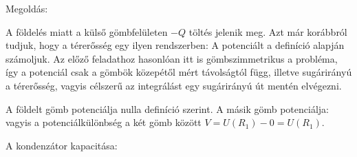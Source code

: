 
\ifdefined\megoldas
 
 Megoldás: 


 A földelés miatt a külső gömbfelületen $-Q$ töltés jelenik meg. Azt már korábbról tudjuk, hogy a térerősség egy ilyen rendszerben:
 A potenciált a definíció alapján számoljuk. Az előző feladathoz hasonlóan itt is gömbszimmetrikus a probléma, így a potenciál csak a gömbök közepétől mért távolságtól függ, illetve sugárirányú a térerősség, vagyis célszerű az integrálást egy sugárirányú út mentén elvégezni.

 A földelt gömb potenciálja nulla definíció szerint. A másik gömb potenciálja:
 vagyis a potenciálkülönbség a két gömb között $V=U(R_1)-0=U(R_1)$.

 A kondenzátor kapacitása:
 
\fi